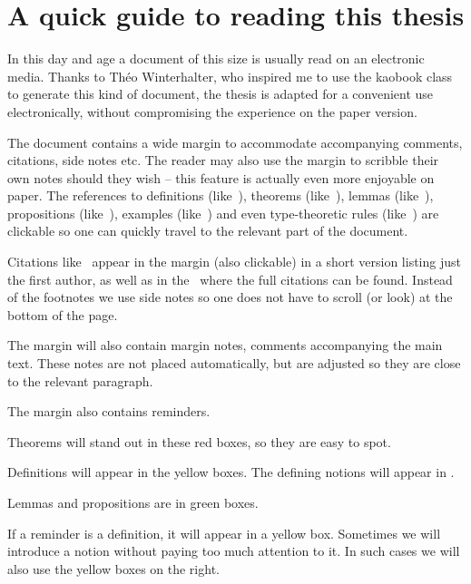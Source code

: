 \chapter{A quick guide to reading this thesis}

In this day and age a document of this size is usually read on an electronic media. Thanks to Théo Winterhalter, who inspired me to use the kaobook class to generate this kind of document, the thesis is adapted for a convenient use electronically, without compromising the experience on the paper version.

The document contains a wide margin to accommodate accompanying comments, citations, side notes etc. The reader may also use the margin to scribble their own notes should they wish -- this feature is actually even more enjoyable on paper.
The references to definitions (like~), theorems (like~), lemmas (like~), propositions (like~), examples (like~) and even type-theoretic rules (like~) are clickable so one can quickly travel to the relevant part of the document.

Citations like~ appear in the
margin (also clickable) in a short version listing just the first author, as well as in the ~where the full citations can be found.
Instead of the footnotes we use side notes
so one does not have to scroll (or look) at the bottom of the page.

The margin will also contain margin notes, comments accompanying the main text.
These notes are not placed automatically, but are adjusted so they are close to
the relevant paragraph.

The margin also contains reminders.

\begin{theorem}
  Theorems will stand out in these red boxes, so they are easy to spot.
\end{theorem}

\begin{definition}
    Definitions will appear in the yellow boxes. The defining notions will appear in .
\end{definition}

\begin{lemma}
    Lemmas and propositions are in green boxes.
\end{lemma}

If a reminder is a definition, it will appear in a yellow box. Sometimes we will introduce a notion without paying too much attention to it. In such cases we will also use the yellow boxes on the right.
